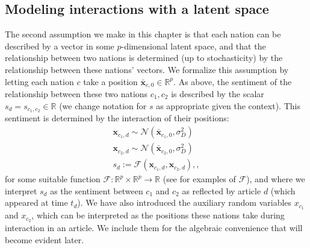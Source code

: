 \subsection{Modeling interactions with a latent space}
\label{sec:fr_latent_space_model}
The second assumption we make in this chapter is that each nation can
be described by a vector in some $p$-dimensional latent space, and
that the relationship between two nations is determined (up to
stochasticity) by the relationship between these nations' vectors.  We
formalize this assumption by letting each nation $c$ take a position
$\bm \bar x_{c,0} \in \mathbb{R}^p$. As above, the sentiment of the
relationship between these two nations $c_1, c_2$ is described by the
scalar $s_d = s_{c_1,c_2} \in \mathbb{R}$ (we change notation for
$s$ as appropriate given the context).  This sentiment is determined
by the interaction of their positions:
\begin{align}
  \bm x_{c_1,d} \sim \mathcal{N}(\bm \bar x_{c_1, 0}, \sigma_D^2) \nonumber \\
  \bm x_{c_2,d} \sim \mathcal{N}(\bm \bar x_{c_2, 0}, \sigma_D^2) \nonumber \\
  s_d := \mathcal{F}(\bm x_{c_1,d}, \bm x_{c_2,d}), \label{eq:sentiment_space},
\end{align}
for some suitable function $\mathcal{F}: \mathbb{R}^p \times
\mathbb{R}^p \rightarrow \mathbb{R}$ (see 
for examples of $\mathcal{F}$), and where we interpret $s_d$ as the
sentiment between $c_1$ and $c_2$ as reflected by article $d$ (which
appeared at time $t_d$).  We have also introduced the auxiliary random
variables $x_{c_1}$ and $x_{c_2}$, which can be interpreted as the
positions these nations take during interaction in an article.  We
include them for the algebraic convenience that will become evident
later.

